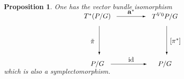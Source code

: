 \documentclass[pdftex]{sigma}
\DeclareMathOperator{\anch}{\mathbf{a}}
\newcommand{\id}{\text{\upshape id}}
\numberwithin{equation}{section}
\newtheorem{Proposition}[Theorem]{Proposition}
 { \theoremstyle{definition}
\newtheorem{Definition}[Theorem]{Definition}
\newtheorem{Example}[Theorem]{Example}
\newtheorem{Remark}[Theorem]{Remark} }
\begin{document}
 \begin{Proposition}\label{thmquo}
One has the vector bundle isomorphism
\begin{gather*} \unitlength=5mm\begin{picture}(11,4.6)(-1.5,0)
 \put(1,4.5){\makebox(0,0){$T^*(P/G)$}}
 \put(8,4.5){\makebox(0,0){$T^{V0}P/G$}}
 \put(1,-0.5){\makebox(0,0){$P/G$}}
 \put(8,-0.5){\makebox(0,0){$P/G$}}
 \put(1.2,3.5){\vector(0,-1){3}}
 \put(8.2,3.5){\vector(0,-1){3}}
 \put(3,4.5){\vector(1,0){3}}
 \put(2.4,-0.5){\vector(1,0){3.7}}
 \put(0.1,1.9){\makebox(0,0){$ \ $}}
 \put(0.5,1.9){\makebox(0,0){$ \tilde\pi $}}
 \put(9.1,1.9){\makebox(0,0){$[\pi^{*}]$}}
 \put(6.8,1.9){\makebox(0,0){$\ $}}
 \put(4.5,5.0){\makebox(0,0){$\anch^* $}}
 \put(4.5,0){\makebox(0,0){$ \id $}}
 \end{picture}\end{gather*}
 which is also a symplectomorphism.
 \end{Proposition}
\end{document}
